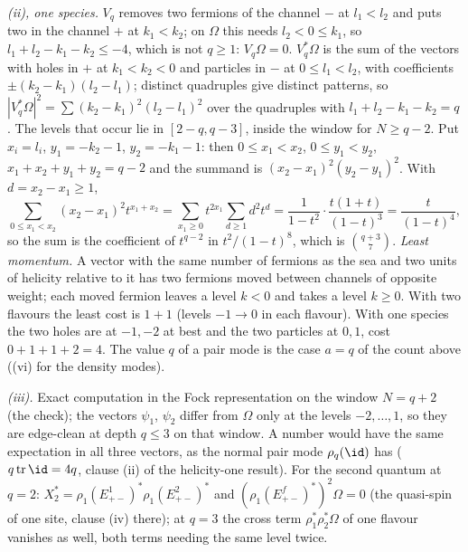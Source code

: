 \emph{(ii), one species.} $V_{q}$ removes two fermions of the channel $-$ at $l_{1} < l_{2}$ and puts two in the channel $+$ at $k_{1} < k_{2}$; on $\Omega$ this needs $l_{2} < 0 \le k_{1}$, so $l_{1} + l_{2} - k_{1} - k_{2} \le -4$, which is not $q \ge 1$: $V_{q}\Omega = 0$. $V_{q}^{*}\Omega$ is the sum of the vectors with holes in $+$ at $k_{1} < k_{2} < 0$ and particles in $-$ at $0 \le l_{1} < l_{2}$, with coefficients $\pm(k_{2} - k_{1})(l_{2} - l_{1})$; distinct quadruples give distinct patterns, so $|V_{q}^{*}\Omega|^{2} = \sum(k_{2} - k_{1})^{2}(l_{2} - l_{1})^{2}$ over the quadruples with $l_{1} + l_{2} - k_{1} - k_{2} = q$. The levels that occur lie in $[2 - q, q - 3]$, inside the window for $N \ge q - 2$. Put $x_{i} = l_{i}$, $y_{1} = -k_{2} - 1$, $y_{2} = -k_{1} - 1$: then $0 \le x_{1} < x_{2}$, $0 \le y_{1} < y_{2}$, $x_{1} + x_{2} + y_{1} + y_{2} = q - 2$ and the summand is $(x_{2} - x_{1})^{2}(y_{2} - y_{1})^{2}$. With $d = x_{2} - x_{1} \ge 1$,
\[
\sum_{0 \le x_{1} < x_{2}}(x_{2} - x_{1})^{2}t^{x_{1} + x_{2}} = \sum_{x_{1} \ge 0}t^{2x_{1}}\sum_{d \ge 1}d^{2}t^{d} = \frac{1}{1 - t^{2}}\cdot\frac{t(1 + t)}{(1 - t)^{3}} = \frac{t}{(1 - t)^{4}} ,
\]
so the sum is the coefficient of $t^{q-2}$ in $t^{2}/(1 - t)^{8}$, which is $\binom{q+3}{7}$. \emph{Least momentum.} A vector with the same number of fermions as the sea and two units of helicity relative to it has two fermions moved between channels of opposite weight; each moved fermion leaves a level $k < 0$ and takes a level $k \ge 0$. With two flavours the least cost is $1 + 1$ (levels $-1 \to 0$ in each flavour). With one species the two holes are at $-1, -2$ at best and the two particles at $0, 1$, cost $0 + 1 + 1 + 2 = 4$. The value $q$ of a pair mode is the case $a = q$ of the count above ((vi) for the density modes).

\emph{(iii).} Exact computation in the Fock representation on the window $N = q + 2$ (the check); the vectors $\psi_{1}$, $\psi_{2}$ differ from $\Omega$ only at the levels $-2, \dots, 1$, so they are edge-clean at depth $q \le 3$ on that window. A number would have the same expectation in all three vectors, as the normal pair mode $\rho_{q}(\id)$ has ($q\operatorname{tr}\id = 4q$, clause (ii) of the helicity-one result). For the second quantum at $q = 2$: $X_{2}^{*} = \rho_{1}(E^{1}_{+-})^{*}\rho_{1}(E^{2}_{+-})^{*}$ and $(\rho_{1}(E^{f}_{+-})^{*})^{2}\Omega = 0$ (the quasi-spin of one site, clause (iv) there); at $q = 3$ the cross term $\rho_{1}^{*}\rho_{2}^{*}\Omega$ of one flavour vanishes as well, both terms needing the same level twice.

